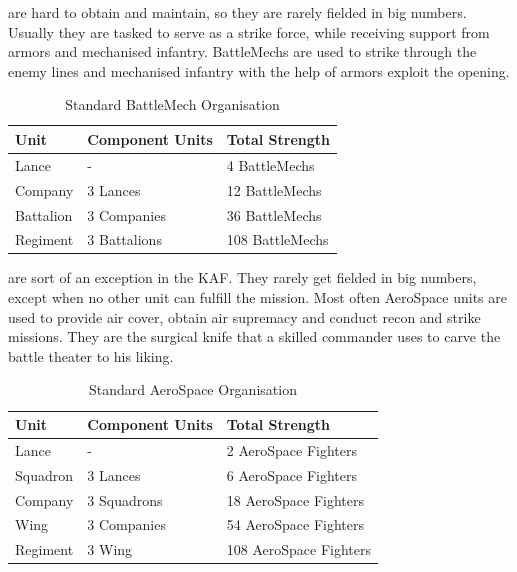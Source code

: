 \documentclass{tufte-book}
\begin{document}
 are hard to obtain and maintain, so they are
rarely fielded in big numbers. Usually they are tasked to serve as a
strike force, while receiving support from armors and mechanised
infantry. BattleMechs are used to strike through the enemy lines and
mechanised infantry with the help of armors exploit the opening.

\bigskip
\begin{table}
\begin{minipage}{\textwidth}
\begin{center}
\begin{tabular}{lll}
\toprule
Unit & Component Units & Total Strength \\
\midrule
Lance     & -            & 4 BattleMechs \\
Company   & 3 Lances     & 12 BattleMechs \\
Battalion & 3 Companies  & 36 BattleMechs \\
Regiment  & 3 Battalions & 108 BattleMechs \\
\bottomrule
\end{tabular}
\end{center}
\end{minipage}
\caption{Standard BattleMech Organisation}
\end{table}

 are sort of an exception in the KAF. 
They rarely get fielded in big numbers, except when no other unit can
fulfill the mission. Most often AeroSpace units are used to provide air
cover, obtain air supremacy and conduct recon and strike missions. They
are the surgical knife that a skilled commander uses to carve the battle
theater to his liking.

\bigskip
\begin{table}
\begin{minipage}{\textwidth}
\begin{center}
\begin{tabular}{lll}
\toprule
Unit & Component Units & Total Strength \\
\midrule
Lance    & -           & 2 AeroSpace Fighters \\
Squadron & 3 Lances    & 6 AeroSpace Fighters \\
Company  & 3 Squadrons & 18 AeroSpace Fighters \\
Wing     & 3 Companies & 54 AeroSpace Fighters \\
Regiment & 3 Wing      & 108 AeroSpace Fighters \\
\bottomrule
\end{tabular}
\end{center}
\end{minipage}
\caption{Standard AeroSpace Organisation}
\end{table}
\end{document}
